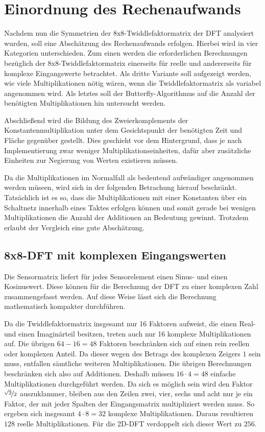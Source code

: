 \section{Einordnung des Rechenaufwands}\label{sec:abschaetzung_Rechenaufwand}
Nachdem nun die Symmetrien der 8x8-Twiddlefaktormatrix der DFT analysiert wurden, soll eine Abschätzung des Rechenaufwands erfolgen.
Hierbei wird in vier Kategorien unterschieden. Zum einen werden die erforderlichen Berechnungen bezüglich der 8x8-Twiddlefaktormatrix einerseits für reelle
und andererseits für komplexe Eingangswerte betrachtet. Als dritte Variante soll aufgezeigt werden, wie viele Multiplikationen nötig wären, wenn die 
Twiddlefaktormatrix als variabel angenommen wird. Als letztes soll der Butterfly-Algorithmus auf die Anzahl der benötigten Multiplikationen
hin untersucht werden.


Abschließend wird die Bildung des Zweierkomplements der Konstantenmultiplikation unter dem Gesichtspunkt der benötigten Zeit und Fläche gegenüber gestellt.
Dies geschieht vor dem Hintergrund, dass je nach Implementierung zwar weniger Multiplikationseinheiten, dafür aber zusätzliche Einheiten zur Negierung von Werten existieren müssen.

Da die Multiplikationen im Normalfall als bedeutend aufwändiger angenommen werden müseen, wird sich in der folgenden Betrachung hierauf beschränkt. Tatsächlich ist es so,
dass die Multiplikationen mit einer Konstanten über ein Schaltnetz innerhalb eines Taktes erfolgen können und somit gerade bei wenigen Multiplikationen die Anzahl der Additionen
an Bedeutung gewinnt. Trotzdem erlaubt der Vergleich eine gute Abschätzung.

\subsection{8x8-DFT mit komplexen Eingangswerten}\label{sec:KomplexeEingangswerte}
Die Sensormatrix liefert für jedes Sensorelement einen Sinus- und einen Kosinuswert. Diese können für die Berechnung der DFT zu einer komplexen Zahl zusammengefasst werden. 
Auf diese Weise lässt sich die Berechnung mathematisch kompakter durchführen.

Da die Twiddlefaktormatrix insgesamt nur 16 Faktoren aufweist, die einen Real- und einen Imaginärteil besitzen, treten auch nur 16 komplexe Multiplikationen auf.
Die übrigen $64-16=48$ Faktoren beschränken sich auf einen rein reellen oder komplexen Anteil. Da dieser wegen des Betrags des komplexen Zeigers $1$ sein muss, entfallen sämtliche 
weiteren Multiplikationen. Die übrigen Berechnungen beschränken sich also auf Additionen.
Deshalb müssen $16\cdot4=48$ einfache Multiplikationen durchgeführt werden.
Da sich es möglich sein wird den Faktor $\nicefrac{\sqrt{2}}{2}$ auszuklammer, bleiben aus den Zeilen zwei, vier, sechs und acht nur je ein Faktor, der mit jeder Spalten
der Eingangsmatrix multipliziert werden muss. So ergeben sich insgesamt $4\cdot8=32$ komplexe Multiplikationen. Daraus resultieren $128$ reelle Multiplikationen.
Für die 2D-DFT verdoppelt sich dieser Wert zu $256$.


